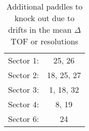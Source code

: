 \begin{table}
\begin{minipage}{\textwidth}
\begin{center}
\begin{singlespacing}

\caption{\label{tab:tofko.additional}Additional paddles to knock out due to drifts in the mean $\Delta$ TOF or resolutions}

\begin{tabular}{lc}

\hline \hline

Sector 1: & 25, 26\\
Sector 2: & 18, 25, 27\\
Sector 3: & 1, 18, 32\\
Sector 4: & 8, 19 \\
Sector 6: & 24 \\

\hline \hline

\end{tabular}

\end{singlespacing}
\end{center}
\end{minipage}
\end{table}